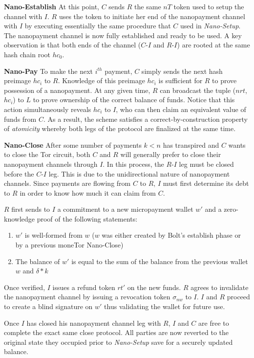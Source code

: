 \textbf{Nano-Establish} At this point, $C$ sends $R$ the same $nT$ token used to
setup the channel with $I$. $R$ uses the token to initiate her end of the
nanopayment channel with $I$ by executing essentially the same procedure that
$C$ used in \emph{Nano-Setup}. The nanopayment channel is now fully established and
ready to be used. A key observation is that both ends of the channel ($C$-$I$
and $R$-$I$) are rooted at the same hash chain root $hc_0$.

\textbf{Nano-Pay} To make the next $i^{th}$ payment, $C$ simply sends the next
hash preimage $hc_i$ to $R$. Knowledge of this preimage $hc_i$ is sufficient for
$R$ to prove possession of a nanopayment. At any given time, $R$ can broadcast
the tuple ($nrt$, $hc_i$) to $L$ to prove ownership of the correct balance of
funds. Notice that this action simultaneously reveals $hc_i$ to $I$, who can
then claim an equivalent value of funds from $C$. As a result, the
scheme satisfies a correct-by-construction property of \emph{atomicity}
whereby both legs of the protocol are finalized at the same time.

\textbf{Nano-Close} After some number of payments $k < n$ has transpired and $C$
wants to close the Tor circuit, both $C$ and $R$ will generally prefer to close
their nanopayment channels through $I$. In this process, the $R$-$I$ leg must be
closed before the $C$-$I$ leg. This is due to the unidirectional nature of
nanopayment channels. Since payments are flowing from $C$ to $R$, $I$ must first
determine its debt to $R$ in order to know how much it can claim from $C$.

$R$ first sends to $I$ a commitment to a new micropayment wallet $w'$ and a
zero-knowledge proof of the following statements:

\begin{enumerate}
\item $w'$ is well-formed from $w$ ($w$ was either created by Bolt's establish phase or by a previous moneTor Nano-Close)
\item The balance of $w'$ is equal to the sum of the balance from the previous
  wallet $w$ and $\delta * k$
\end{enumerate}

Once verified, $I$ issues a refund token $rt'$ on the new funds. $R$ agrees to
invalidate the nanopayment channel by issuing a revocation token $\sigma_{nw}$
to $I$. $I$ and $R$ proceed to create a blind signature on $w'$ thus validating
the wallet for future use.

Once $I$ has closed his nanopayment channel leg with $R$, $I$ and $C$ are free
to complete the exact same close protocol. All parties are now reverted to the
original state they occupied prior to \emph{Nano-Setup} save for a securely updated
balance.

